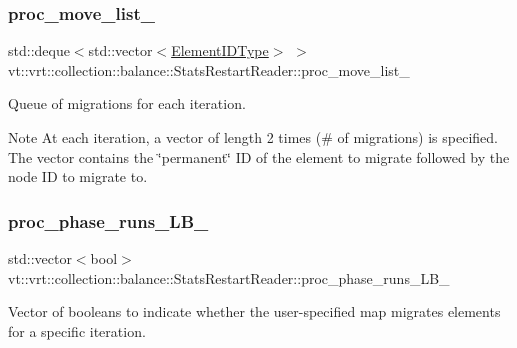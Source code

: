 \subsubsection{\texorpdfstring{proc\+\_\+move\+\_\+list\+\_\+}{proc\_move\_list\_}}
{\footnotesize\ttfamily std\+::deque$<$std\+::vector$<$\hyperlink{namespacevt_1_1vrt_1_1collection_1_1balance_a592736f733df4f90856df90a1fd08905}{Element\+I\+D\+Type}$>$ $>$ vt\+::vrt\+::collection\+::balance\+::\+Stats\+Restart\+Reader\+::proc\+\_\+move\+\_\+list\+\_\+\hspace{0.3cm}{\ttfamily [private]}}



Queue of migrations for each iteration. 

\begin{DoxyNote}{Note}
At each iteration, a vector of length 2 times (\# of migrations) is specified. The vector contains the \char`\"{}permanent\char`\"{} ID of the element to migrate followed by the node ID to migrate to. 
\end{DoxyNote}
\mbox{\label{structvt_1_1vrt_1_1collection_1_1balance_1_1_stats_restart_reader_a52d652c1465e46f12d5915bc98dc618b}} 
\subsubsection{\texorpdfstring{proc\+\_\+phase\+\_\+runs\+\_\+\+L\+B\+\_\+}{proc\_phase\_runs\_LB\_}}
{\footnotesize\ttfamily std\+::vector$<$bool$>$ vt\+::vrt\+::collection\+::balance\+::\+Stats\+Restart\+Reader\+::proc\+\_\+phase\+\_\+runs\+\_\+\+L\+B\+\_\+\hspace{0.3cm}{\ttfamily [private]}}



Vector of booleans to indicate whether the user-\/specified map migrates elements for a specific iteration. 

\mbox{\label{structvt_1_1vrt_1_1collection_1_1balance_1_1_stats_restart_reader_ad4039b19a32b7269be28d2a66322c7e3}} 
